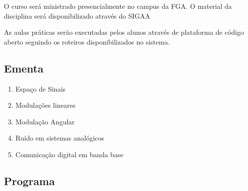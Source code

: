     O curso será ministrado presencialmente no campus da FGA. O material da disciplina será disponibilizado através do SIGAA 

    As aulas práticas serão executadas pelos alunos através de plataforma de código aberto seguindo os roteiros disponibilizados no sistema.  
    
  
  \begin{snugshade}
  \section{Ementa} 
  \end{snugshade}
  
  \begin{enumerate}
     \item Espaço de Sinais
      \item Modulações lineares
      \item Modulação Angular
      \item Ruído em sistemas analógicos 
      \item Comunicação digital em banda base 
  \end{enumerate}
  
\newpage
  \begin{snugshade}
  \section{Programa} 
  \end{snugshade}
  
